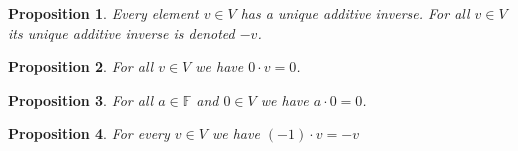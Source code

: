\documentclass[12pt,letterpaper]{amsart}
\theoremstyle{plain}
\newtheorem{proposition}{Proposition}[section]
\theoremstyle{definition}
\numberwithin{equation}{section}
\begin{document}
\begin{proposition}Every element $v\in V$ has a unique additive inverse. For all $v\in V$ its unique additive inverse is denoted $-v$. 
\end{proposition}

\begin{proposition}For all $v\in V$ we have $0\cdot v=0$. 
\end{proposition}

\begin{proposition}For all $a\in \mathbb{F}$ and $0\in V$ we have $a\cdot 0=0$.
\end{proposition}

\begin{proposition}For every $v\in V$ we have $(-1)\cdot v=-v$
\end{proposition}
\end{document}
